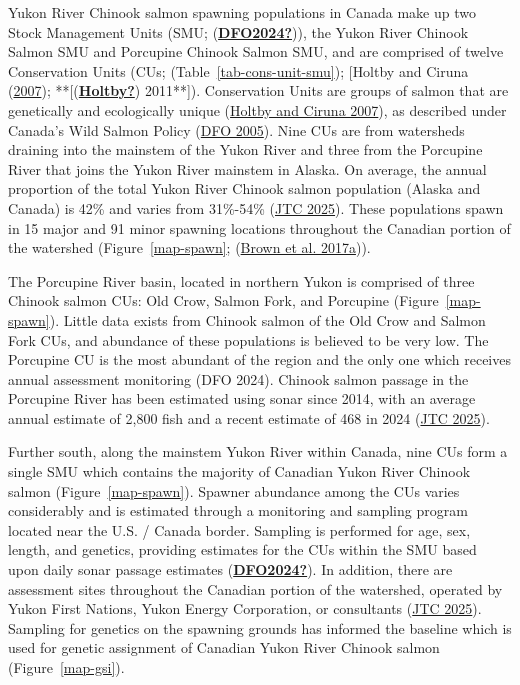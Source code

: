 \documentclass[11pt]{book}
\begin{document}
Yukon River Chinook salmon spawning populations in Canada make up two Stock Management Units (SMU; (\protect\hyperlink{ref-DFO2024}{\textbf{DFO2024?}})), the Yukon River Chinook Salmon SMU and Porcupine Chinook Salmon SMU, and are comprised of twelve Conservation Units (CUs; (Table~\ref{tab-cons-unit-smu}); {[}Holtby and Ciruna (\protect\hyperlink{ref-holtbyConservationUnitsPacific2007}{2007}); **{[}(\protect\hyperlink{ref-Holtby}{\textbf{Holtby?}}) 2011**{]}). Conservation Units are groups of salmon that are genetically and ecologically unique (\protect\hyperlink{ref-holtbyConservationUnitsPacific2007}{Holtby and Ciruna 2007}), as described under Canada's Wild Salmon Policy (\protect\hyperlink{ref-WSP2005}{DFO 2005}). Nine CUs are from watersheds draining into the mainstem of the Yukon River and three from the Porcupine River that joins the Yukon River mainstem in Alaska. On average, the annual proportion of the total Yukon River Chinook salmon population (Alaska and Canada) is 42\% and varies from 31\%-54\% (\protect\hyperlink{ref-JTC2025Report}{JTC 2025}). These populations spawn in 15 major and 91 minor spawning locations throughout the Canadian portion of the watershed (Figure~\ref{map-spawn}; (\protect\hyperlink{ref-brown_catalog_2017}{Brown et al. 2017a})).

The Porcupine River basin, located in northern Yukon is comprised of three Chinook salmon CUs: Old Crow, Salmon Fork, and Porcupine (Figure~\ref{map-spawn}). Little data exists from Chinook salmon of the Old Crow and Salmon Fork CUs, and abundance of these populations is believed to be very low. The Porcupine CU is the most abundant of the region and the only one which receives annual assessment monitoring (DFO 2024). Chinook salmon passage in the Porcupine River has been estimated using sonar since 2014, with an average annual estimate of 2,800 fish and a recent estimate of 468 in 2024 (\protect\hyperlink{ref-JTC2025Report}{JTC 2025}).

Further south, along the mainstem Yukon River within Canada, nine CUs form a single SMU which contains the majority of Canadian Yukon River Chinook salmon (Figure~\ref{map-spawn}). Spawner abundance among the CUs varies considerably and is estimated through a monitoring and sampling program located near the U.S. / Canada border. Sampling is performed for age, sex, length, and genetics, providing estimates for the CUs within the SMU based upon daily sonar passage estimates (\protect\hyperlink{ref-DFO2024}{\textbf{DFO2024?}}). In addition, there are assessment sites throughout the Canadian portion of the watershed, operated by Yukon First Nations, Yukon Energy Corporation, or consultants (\protect\hyperlink{ref-JTC2025Report}{JTC 2025}). Sampling for genetics on the spawning grounds has informed the baseline which is used for genetic assignment of Canadian Yukon River Chinook salmon (Figure~\ref{map-gsi}).
\end{document}
